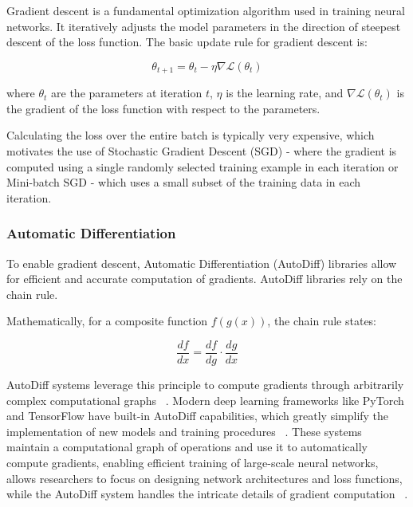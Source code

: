 \documentclass[a4paper, oneside]{discothesis}
\begin{document}
Gradient descent is a fundamental optimization algorithm used in training neural networks. It iteratively adjusts the model parameters in the direction of steepest descent of the loss function. The basic update rule for gradient descent is:

\begin{equation}
    \theta_{t+1} = \theta_t - \eta \nabla \mathcal{L}(\theta_t)
\end{equation}

where $\theta_t$ are the parameters at iteration $t$, $\eta$ is the learning rate, and $\nabla \mathcal{L}(\theta_t)$ is the gradient of the loss function with respect to the parameters.

Calculating the loss over the entire batch is typically very expensive, which motivates the use of Stochastic Gradient Descent (SGD) -  where the gradient is computed using a single randomly selected training example in each iteration or Mini-batch SGD - which uses a small subset of the training data in each iteration.

\subsubsection{Automatic Differentiation}

To enable gradient descent, Automatic Differentiation (AutoDiff) libraries allow for efficient and accurate computation of gradients. AutoDiff libraries rely on the chain rule. 

Mathematically, for a composite function $f(g(x))$, the chain rule states:

\begin{equation}
    \frac{df}{dx} = \frac{df}{dg} \cdot \frac{dg}{dx}
\end{equation}

AutoDiff systems leverage this principle to compute gradients through arbitrarily complex computational graphs ~\cite{griewank2008evaluating}. Modern deep learning frameworks like PyTorch and TensorFlow have built-in AutoDiff capabilities, which greatly simplify the implementation of new models and training procedures ~\cite{paszke2019pytorch, abadi2016tensorflow}. These systems maintain a computational graph of operations and use it to automatically compute gradients, enabling efficient training of large-scale neural networks, allows researchers to focus on designing network architectures and loss functions, while the AutoDiff system handles the intricate details of gradient computation ~\cite{baydin2018automatic}.
\end{document}
